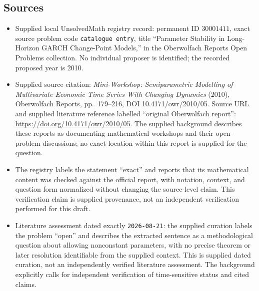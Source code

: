 \documentclass[11pt]{article}
\begin{document}
\subsection{Sources}
\begin{itemize}
\item Supplied local UnsolvedMath registry record: permanent ID \(30001411\), exact source problem code \texttt{catalogue entry}, title ``Parameter Stability in Long-Horizon GARCH Change-Point Models,'' in the Oberwolfach Reports Open Problems collection. No individual proposer is identified; the recorded proposed year is 2010.
\item Supplied source citation: \emph{Mini-Workshop: Semiparametric Modelling of Multivariate Economic Time Series With Changing Dynamics} (2010), Oberwolfach Reports, pp.\ 179--216, DOI 10.4171/owr/2010/05. Source URL and supplied literature reference labelled ``original Oberwolfach report'': \url{https://doi.org/10.4171/owr/2010/05}. The supplied background describes these reports as documenting mathematical workshops and their open-problem discussions; no exact location within this report is supplied for the question.
\item The registry labels the statement ``exact'' and reports that its mathematical content was checked against the official report, with notation, context, and question form normalized without changing the source-level claim. This verification claim is supplied provenance, not an independent verification performed for this draft.
\item Literature assessment dated exactly \texttt{2026-08-21}: the supplied curation labels the problem ``open'' and describes the extracted sentence as a methodological question about allowing nonconstant parameters, with no precise theorem or later resolution identifiable from the supplied context. This is supplied dated curation, not an independently verified literature assessment. The background explicitly calls for independent verification of time-sensitive status and cited claims.
\end{itemize}
\end{document}
